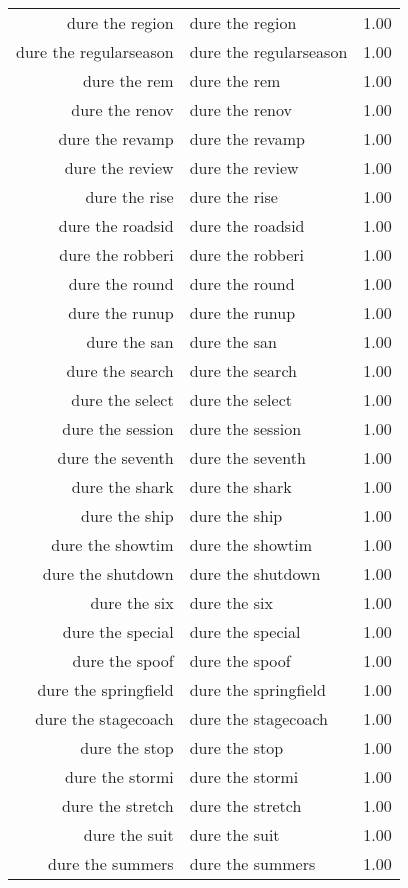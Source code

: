 \begin{table}[ht]
\begin{tabular}{rlr}
  dure the region & dure the region & 1.00 \\ 
  dure the regularseason & dure the regularseason & 1.00 \\ 
  dure the rem & dure the rem & 1.00 \\ 
  dure the renov & dure the renov & 1.00 \\ 
  dure the revamp & dure the revamp & 1.00 \\ 
  dure the review & dure the review & 1.00 \\ 
  dure the rise & dure the rise & 1.00 \\ 
  dure the roadsid & dure the roadsid & 1.00 \\ 
  dure the robberi & dure the robberi & 1.00 \\ 
  dure the round & dure the round & 1.00 \\ 
  dure the runup & dure the runup & 1.00 \\ 
  dure the san & dure the san & 1.00 \\ 
  dure the search & dure the search & 1.00 \\ 
  dure the select & dure the select & 1.00 \\ 
  dure the session & dure the session & 1.00 \\ 
  dure the seventh & dure the seventh & 1.00 \\ 
  dure the shark & dure the shark & 1.00 \\ 
  dure the ship & dure the ship & 1.00 \\ 
  dure the showtim & dure the showtim & 1.00 \\ 
  dure the shutdown & dure the shutdown & 1.00 \\ 
  dure the six & dure the six & 1.00 \\ 
  dure the special & dure the special & 1.00 \\ 
  dure the spoof & dure the spoof & 1.00 \\ 
  dure the springfield & dure the springfield & 1.00 \\ 
  dure the stagecoach & dure the stagecoach & 1.00 \\ 
  dure the stop & dure the stop & 1.00 \\ 
  dure the stormi & dure the stormi & 1.00 \\ 
  dure the stretch & dure the stretch & 1.00 \\ 
  dure the suit & dure the suit & 1.00 \\ 
  dure the summers & dure the summers & 1.00 \\ 

\end{tabular}
\end{table}

